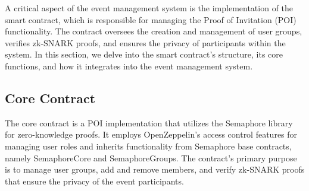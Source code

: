 A critical aspect of the event management system is the implementation of the smart contract, which is responsible for managing the Proof of Invitation (POI) functionality. The contract oversees the creation and management of user groups, verifies zk-SNARK proofs, and ensures the privacy of participants within the system. In this section, we delve into the smart contract's structure, its core functions, and how it integrates into the event management system.

\subsection{Core Contract}

The core contract is a POI implementation that utilizes the Semaphore library for zero-knowledge proofs. It employs OpenZeppelin's access control features for managing user roles and inherits functionality from Semaphore base contracts, namely SemaphoreCore and SemaphoreGroups. The contract's primary purpose is to manage user groups, add and remove members, and verify zk-SNARK proofs that ensure the privacy of the event participants.

